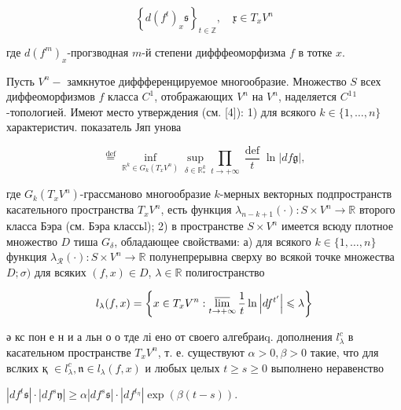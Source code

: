 \documentclass[10pt]{article}
\begin{document}
\[

\left\{d\left(f^{t}\right)_{x} \mathfrak{s}\right\}_{t \in \mathbb{Z}}, \quad \mathfrak{x} \in T_{x} V^{n}

\]



где $d\left(f^{m}\right)_{x}$-прогзводная $m$-й степени дифффеоморфизма $f$ в тотке $x$.



Пусть $V^{n}-$ замкнутое диффференцируемое многообразие. Множество $S$ всех диффеоморфизмов $f$ класса $C^{1}$, отображающих $V^{n}$ на $V^{n}$, наделяется $C^{1}{ }^{1}$-топологией. Имеют место утверждения (см. [4]): 1) для всякого $k \in\{1, \ldots, n\}$ характеристич. показатель Јяп унова



\[

\stackrel{\operatorname{def}}{=} \inf _{\mathbb{R}^{k} \in G_{k}\left(T_{x} V^{n}\right)} \sup _{\mathfrak{\delta} \in \mathbb{R}_{*}^{k}} \prod_{t \rightarrow+\infty} \frac{\operatorname{def}}{t} \ln |d f \mathfrak{g}|,

\]



где $G_{k}\left(T_{x} V^{n}\right)$-грассманово многообразие $k$-мерных векторных подпространств касательного пространства $T_{x} V^{n}$, есть функция $\lambda_{n-k+1}(\cdot): S \times V^{n} \longrightarrow \mathbb{R}$ второго класса Бэра (см. Бэра классьl); 2) в пространстве $S \times V^{n}$ имеется всюду плотное множество $D$ тиша $G_{\delta}$, обладающее свойствами: а) для всякого $k \in\{1, \ldots, n\}$ функция $\lambda_{\mathcal{R}}(\cdot): S \times V^{n} \longrightarrow \mathbb{R}$ полунепрерывна сверху во всякоӥ точке множества $D ; \sigma)$ для всяких $(f, x) \in D$, $\lambda \in \mathbb{R}$ полигостранство



\[

l_{\lambda}(f, x)=\left\{x \in T_{x} V^{n}: \varlimsup_{t \rightarrow+\infty} \frac{1}{t} \ln \left|d f^{t^{\prime}}\right| \leqslant \lambda\right\}

\]



ә кс пон е н и а льн о о тде лі ено от своего алгебраиq. дополнения $l_{\lambda}^{c}$ в касательном пространстве $T_{x} V^{n}$, т. е. существуют $\alpha>0, \beta>0$ такие, что для вслких қ $\in l_{\lambda}^{c}, \mathfrak{n} \in l_{\lambda}(f, x)$ и любых целых $t \geqslant s \geqslant 0$ выполнено неравенство



$\left|d f^{t} \mathfrak{s}\right| \cdot\left|d f^{s} \mathfrak{y}\right| \geqslant \alpha\left|d f^{s} \mathfrak{s}\right| \cdot\left|d f^{t_{\mathfrak{\eta}}}\right| \exp (\beta(t-s))$.
\end{document}
